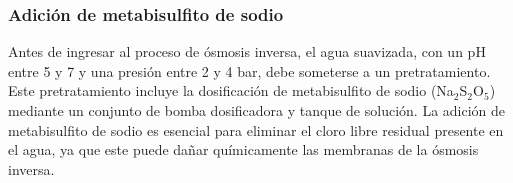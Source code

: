 \subsubsection{Adición de metabisulfito de sodio}

Antes de ingresar al proceso de ósmosis inversa, el agua suavizada, con un pH entre 5 y 7 y una presión entre 2 y 4 bar, debe someterse a un pretratamiento.
Este pretratamiento incluye la dosificación de metabisulfito de sodio (Na$_2$S$_2$O$_5$) mediante un conjunto de bomba dosificadora y tanque de solución.
La adición de metabisulfito de sodio es esencial para eliminar el cloro libre residual presente en el agua,
ya que este puede dañar químicamente las membranas de la ósmosis inversa.